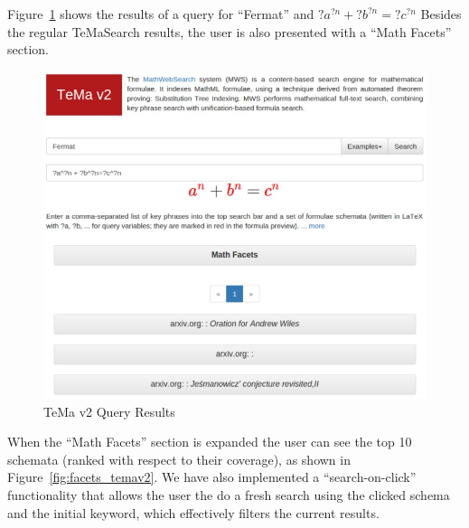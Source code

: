 \documentclass{deliverablereport}
\begin{document}
Figure~\ref{fig:temav2query} shows the results of a query for “Fermat” and $?a^{?n}+?b^{?n}=?c^{?n}$ Besides the regular TeMaSearch results, the user is also presented with a “Math Facets” section.

\begin{figure}[H]
\centering
 \includegraphics[scale=0.6]{figure9.jpg}
 \caption{TeMa v2 Query Results}
 \label{fig:temav2query}
\end{figure}

When the “Math Facets” section is expanded the user can see the top 10 schemata (ranked with respect to their coverage), as shown in Figure~\ref{fig:facets_temav2}. We have also implemented a “search-on-click” functionality that allows the user the do a fresh search using the clicked schema and the initial keyword, which effectively filters the current results.
\end{document}
